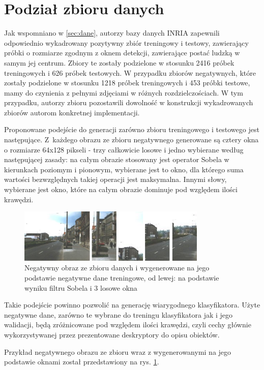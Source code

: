 \section{Podział zbioru danych}
\label{sec:podzial}

Jak wspomniano w \ref{sec:dane}, autorzy bazy danych INRIA zapewnili odpowiednio wykadrowany pozytywny zbiór treningowy i testowy, zawierający próbki o rozmiarze zgodnym z oknem detekcji, zawierające postać ludzką w samym jej centrum. Zbiory te zostały podzielone w stosunku 2416 próbek treningowych i 626 próbek testowych.
W przypadku zbiorów negatywnych, które zostały podzielone w stosunku 1218 próbek treningowych i 453 próbki testowe, mamy do czynienia z pełnymi zdjęciami w różnych rozdzielczościach. W tym przypadku, autorzy zbioru pozostawili dowolność w konstrukcji wykadrowanych zbiorów autorom konkretnej implementacji.

Proponowane podejście do generacji zarówno zbioru treningowego i testowego jest następujące.
Z~każdego obrazu ze zbioru negatywnego generowane są cztery okna o rozmiarze 64x128 pikseli - trzy całkowicie losowe i jedno wybierane według następującej zasady:
na całym obrazie stosowany jest operator Sobela w kierunkach poziomym i pionowym, wybierane jest to okno, dla którego suma wartości bezwzględnych takiej operacji jest maksymalna. Innymi słowy, wybierane jest okno, które na całym obrazie dominuje pod względem ilości krawędzi.

\begin{figure}[htb]
\centering
\includegraphics[width=0.8\textwidth]{ch3_sobel.png}
\caption{Negatywny obraz ze zbioru danych i wygenerowane na jego podstawie negatywne dane treningowe, od lewej: na podstawie wyniku filtru Sobela i 3 losowe okna}
\label{fig:sobel}
\end{figure}

Takie podejście powinno pozwolić na generację wiarygodnego klasyfikatora. Użyte negatywne dane, zarówno te wybrane do treningu klasyfikatora jak i jego walidacji, będą zróżnicowane pod względem ilości krawędzi, czyli cechy głównie wykorzystywanej przez prezentowane deskryptory do opisu obiektów.

Przykład negatywnego obrazu ze zbioru wraz z wygenerowanymi na jego podstawie oknami został przedstawiony na rys. \ref{fig:sobel}.

